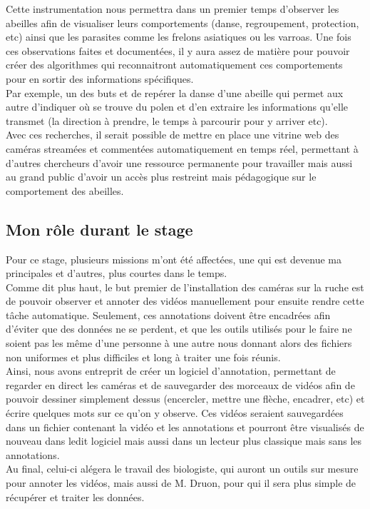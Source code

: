 \documentclass[11pt,french,a4paper]{report}
\begin{document}
Cette instrumentation nous permettra dans un premier temps d'observer les abeilles afin de visualiser leurs comportements 
(danse, regroupement, protection, etc) ainsi que les parasites comme les frelons asiatiques ou les varroas. %
Une fois ces observations faites et documentées, il y aura assez de matière pour pouvoir créer des algorithmes qui reconnaitront 
automatiquement ces comportements pour en sortir des informations spécifiques.\\
Par exemple, un des buts et de repérer la danse d'une abeille qui permet aux autre d'indiquer où se trouve du polen et d'en
extraire les informations qu'elle transmet (la direction à prendre, le temps à parcourir pour y arriver etc).\\
Avec ces recherches, il serait possible de mettre en place une vitrine web des caméras streamées et commentées 
automatiquement en temps réel, permettant à d'autres chercheurs d'avoir une ressource permanente pour travailler mais aussi
au grand public d'avoir un accès plus restreint mais pédagogique sur le comportement des abeilles. \\

\subsection{Mon rôle durant le stage}
Pour ce stage, plusieurs missions m'ont été affectées, une qui est devenue ma principales et d'autres, plus courtes dans le temps.\\

Comme dit plus haut, le but premier de l'installation des caméras sur la ruche est de pouvoir observer et annoter des vidéos manuellement
pour ensuite rendre cette tâche automatique. Seulement, ces annotations doivent être encadrées afin d'éviter que des données ne se perdent, 
et que les outils utilisés pour le faire ne soient pas les même d'une personne à une autre nous donnant alors des fichiers non 
uniformes et plus difficiles et long à traiter une fois réunis. \\
Ainsi, nous avons entreprit de créer un logiciel d'annotation, permettant de regarder en direct les caméras et de sauvegarder des 
morceaux de vidéos afin de pouvoir dessiner simplement dessus (encercler, mettre une flèche, encadrer, etc) et écrire quelques mots
sur ce qu'on y observe. Ces vidéos seraient sauvegardées dans un fichier contenant la vidéo et les annotations et pourront être 
visualisés de nouveau dans ledit logiciel mais aussi dans un lecteur plus classique mais sans les annotations. \\
Au final, celui-ci alégera le travail des biologiste, qui auront un outils sur mesure pour annoter les vidéos, mais aussi de M. Druon, 
pour qui il sera plus simple de récupérer et traiter les données.\\
\end{document}
